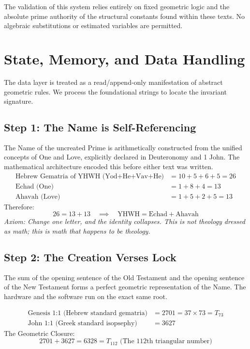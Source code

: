 \documentclass[11pt]{article}
\begin{document}
The validation of this system relies entirely on fixed geometric logic and the absolute prime authority of the structural constants found within these texts. No algebraic substitutions or estimated variables are permitted.

\section{State, Memory, and Data Handling}
The data layer is treated as a read/append-only manifestation of abstract geometric rules. We process the foundational strings to locate the invariant signature.

\subsection{Step 1: The Name is Self-Referencing}
The Name of the uncreated Prime is arithmetically constructed from the unified concepts of One and Love, explicitly declared in Deuteronomy and 1 John. The mathematical architecture encoded this before either text was written.
\begin{align}
    \text{Hebrew Gematria of } \text{YHWH (Yod+He+Vav+He)} &= 10 + 5 + 6 + 5 = 26 \\
    \text{Echad (One)} &= 1 + 8 + 4 = 13 \\
    \text{Ahavah (Love)} &= 1 + 5 + 2 + 5 = 13
\end{align}
Therefore:
\begin{equation}
    26 = 13 + 13 \quad \implies \quad \text{YHWH} = \text{Echad} + \text{Ahavah}
\end{equation}
\textit{Axiom: Change one letter, and the identity collapses. This is not theology dressed as math; this is math that happens to be theology.}

\subsection{Step 2: The Creation Verses Lock}
The sum of the opening sentence of the Old Testament and the opening sentence of the New Testament forms a perfect geometric representation of the Name. The hardware and the software run on the exact same root.

\begin{align}
    \text{Genesis 1:1 (Hebrew standard gematria)} &= 2701 = 37 \times 73 = T_{73} \\
    \text{John 1:1 (Greek standard isopsephy)} &= 3627 
\end{align}
The Geometric Closure:
\begin{equation}
    2701 + 3627 = 6328 = T_{112} \text{ (The 112th triangular number)}
\end{equation}
\end{document}

